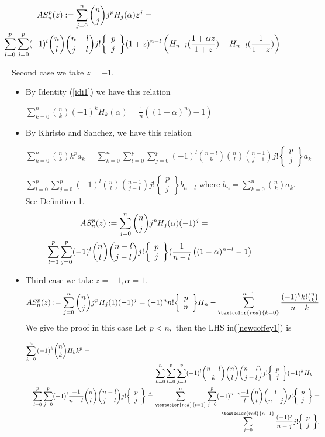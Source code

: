 \documentclass[a4paper,10pt,oneside]{article}
\newcommand{\col}[2]{ \textcolor{#1}{#2}}
\newcommand{\dsum}[3]{\displaystyle \sum_{#1}^{#2}{#3}}
\newcommand{\st}[2]{\mbox{$\left\{\begin{array}{c}{#1}\\{#2} \end{array}\right\}$}}
\newcommand{\srel}[2]{\stackrel{#1}{#2}}
\theoremstyle{definition}
\theoremstyle{remark}
\begin{document}
\begin{description}
\begin{itemize}
\begin{eqnarray}
 \lefteqn{ AS_n^p(z):=\sum_{j=0}^n\binom{n}{j}j^p H_j(\alpha)z^j=}\\
&&\hspace{-50pt} \sum_{l=0}^p\sum_{j=0}^p(-1)^l\binom{n}{l}\binom{n-l}{j-l}j!\st{p}{j}(1+z)^{n-l}\left(H_{n-l}(\frac{1+\alpha z}{1+z})-H_{n-l}(\frac{1}{1+z})\right)\label{newcoffey}\\
 \end{eqnarray}
\end{itemize}
\item  Second  case we take $z=-1.$
\begin{itemize}
\item By Identity (\ref{idi1})    we have  this relation\par 
 $\sum_{k=0}^n\binom{n}{k}(-1)^kH_k(\alpha)=\frac{1}{n}\left((1-\alpha)^n)-1\right)$
 \item By Khristo and Sanchez, we have this relation %
 \par  
 $\sum_{k=0}^n\binom{n}{k}k^pa_k=\sum_{k=0}^n\sum_{l=0}^p\sum_{j=0}^p(-1)^l\binom{n-l}{k}\binom{n}{l}\binom{n-1}{j-1}j!\st{p}{j}a_k=$\par
$\sum_{l=0}^p\sum_{j=0}^p(-1)^l\binom{n}{l}\binom{n-1}{j-1}j!\st{p}{j}b_{n-l}$ where  $b_n=\sum_{k=0}^n\binom{n}{k} a_k.$ See Definition 1.
\begin{eqnarray}
 \lefteqn{ AS_n^p(z):=\sum_{j=0}^n\binom{n}{j}j^p H_j(\alpha)(-1)^j=}\\
&&\hspace{-50pt} \sum_{l=0}^p\sum_{j=0}^p(-1)^l\binom{n}{l}\binom{n-l}{j-l}j!\st{p}{j}(\frac{1}{n-l}\left((1-\alpha)^{n-l}-1\right)\label{newcoff}
 \end{eqnarray}
 \item  Third   case we take $z=-1, \alpha=1.$
 \begin{eqnarray}
  AS_n^p(z):=\sum_{j=0}^n\binom{n}{j}j^p H_j(1)(-1)^j=(-1)^nn!\st{p}{n}H_n-\dsum{\col{red}{k=0}}{n-1}{\frac{(-1)^kk!{\binom{n}{k}}}{n-k}}\label{newcoffey1}
\end{eqnarray}
We give the proof in this case 
 Let $ p<n,$ then the LHS in(\ref{newcoffey1}) is  \par
  \begin{eqnarray*}
  \lefteqn{\dsum{k=0}{n}{(-1)^k\binom{n}{k}H_kk^p}=}\\
&&\sum_{k=0}^n\sum_{l=0}^{p}\sum_{j=0}^p(-1)^l\binom{n-l}{k}\binom{n}{l}\binom{n-l}{j-l}j!\st{p}{j}(-1)^kH_k=\\
&&\sum_{l=0}^{p}\sum_{j=0}^p(-1)^l\frac{-1}{n-l}\binom{n}{l}\binom{n-l}{j-l}j!\st{p}{j}\srel{*}{=}\sum_{\col{red}{t=1}}^{n}\sum_{j=0}^p(-1)^{n-t}\frac{-1}{t}\binom{n}{t}\binom{t}{n-j}j!\st{p}{j}=\\
&&-\sum_{j=0}^{\col{red}{n-1}}\frac{(-1)^j}{n-j}j!\st{p}{j}.\\
\end{eqnarray*}


\end{itemize}
\end{description}
\end{document}
